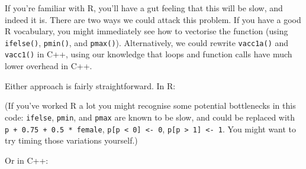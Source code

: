 If you're familiar with R, you'll have a gut feeling that this will be
slow, and indeed it is. There are two ways we could attack this problem.
If you have a good R vocabulary, you might immediately see how to
vectorise the function (using \texttt{ifelse()}, \texttt{pmin()}, and
\texttt{pmax()}). Alternatively, we could rewrite \texttt{vacc1a()} and
\texttt{vacc1()} in C++, using our knowledge that loops and function
calls have much lower overhead in C++.

Either approach is fairly straightforward. In R:

\begin{Shaded}
\begin{Highlighting}[]
\StringTok{ }
\StringTok{ } \OperatorTok{+}\StringTok{ } \OperatorTok{*}\StringTok{ } \OperatorTok{/}\StringTok{ }\NormalTok{(} \OperatorTok{-}\StringTok{ }\NormalTok{(} \OperatorTok{*}\StringTok{ }\OperatorTok{+}\StringTok{ } \OperatorTok{*}\StringTok{ }
\StringTok{ }\OperatorTok{*}\StringTok{ }\NormalTok{, }\NormalTok{)}
\StringTok{ }\NormalTok{(}
\StringTok{ }\NormalTok{(}
\NormalTok{\}}
\end{Highlighting}
\end{Shaded}

(If you've worked R a lot you might recognise some potential bottlenecks
in this code: \texttt{ifelse}, \texttt{pmin}, and \texttt{pmax} are
known to be slow, and could be replaced with
\texttt{p\ +\ 0.75\ +\ 0.5\ *\ female},
\texttt{p{[}p\ \textless{}\ 0{]}\ \textless{}-\ 0},
\texttt{p{[}p\ \textgreater{}\ 1{]}\ \textless{}-\ 1}. You might want to
try timing those variations yourself.)

Or in C++:


